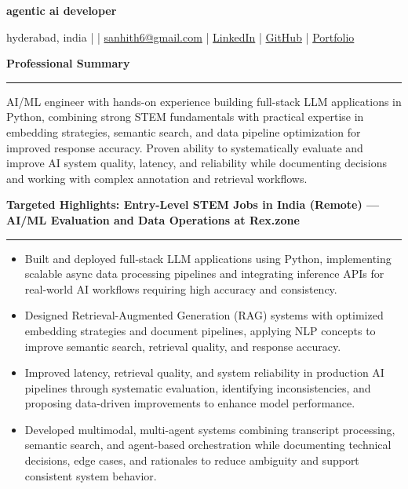 \documentclass[9pt, letterpaper]{article}
\newcommand{\name}[1]{%
    \begin{center}
        {\LARGE \textbf{#1}}
    \end{center}
}
\newcommand{\sectionheading}[1]{%
    \vspace{4pt}%
    {\large \textbf{#1}}%
    \vspace{1pt}%
    \hrule
    \vspace{2pt}%
}
\begin{document}
\name{agentic ai developer}
\begin{center}
    hyderabad, india \quad |  \quad | \quad
    \href{mailto:sanhith6@gmail.com}{sanhith6@gmail.com} \quad | \quad
    \href{https://www.linkedin.com/in/sanhith-reddy-740a1625b/}{LinkedIn} \quad | \quad
    \href{https://github.com/tsanhith}{GitHub} \quad | \quad
    \href{https://johndoe.dev}{Portfolio}
\end{center}

\vspace{0pt}

\sectionheading{Professional Summary}
AI/ML engineer with hands-on experience building full-stack LLM applications in Python, combining strong STEM fundamentals with practical expertise in embedding strategies, semantic search, and data pipeline optimization for improved response accuracy. Proven ability to systematically evaluate and improve AI system quality, latency, and reliability while documenting decisions and working with complex annotation and retrieval workflows.

\sectionheading{Targeted Highlights: Entry-Level STEM Jobs in India (Remote) — AI/ML Evaluation and Data Operations at Rex.zone}
\begin{itemize}[leftmargin=0.25in, itemindent=-0.15in, label={--}]
    \item Built and deployed full-stack LLM applications using Python, implementing scalable async data processing pipelines and integrating inference APIs for real-world AI workflows requiring high accuracy and consistency.
    \item Designed Retrieval-Augmented Generation (RAG) systems with optimized embedding strategies and document pipelines, applying NLP concepts to improve semantic search, retrieval quality, and response accuracy.
    \item Improved latency, retrieval quality, and system reliability in production AI pipelines through systematic evaluation, identifying inconsistencies, and proposing data-driven improvements to enhance model performance.
    \item Developed multimodal, multi-agent systems combining transcript processing, semantic search, and agent-based orchestration while documenting technical decisions, edge cases, and rationales to reduce ambiguity and support consistent system behavior.
\end{itemize}
\end{document}
